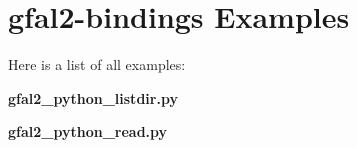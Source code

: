 \section{gfal2-bindings Examples}
Here is a list of all examples:\begin{CompactItemize}
\item 
\bf{gfal2\_\-python\_\-listdir.py}
\item 
\bf{gfal2\_\-python\_\-read.py}
\end{CompactItemize}
